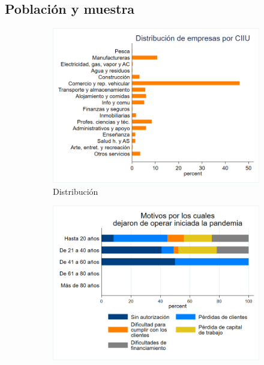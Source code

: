 \documentclass[12pt,a4paper]{article} %
\begin{document}
    \subsection{Población y muestra}
			\lipsum[1]
			\begin{figure}[ht]
      	\centering
        \begin{subfigure}[b]{0.3\textwidth}
        	\centering
          \includegraphics[width=\textwidth]{EXAMEN_FINAL/Imagenes/Graph1.png}
          \caption{Distribución}
          \label{fig: Distribución}
        \end{subfigure}
        \hfill
        \begin{subfigure}[b]{0.3\textwidth}
        	\centering
          \includegraphics[width=\textwidth]{EXAMEN_FINAL/Imagenes/Graph2.png}

\end{subfigure}
\end{figure}
\end{document}
